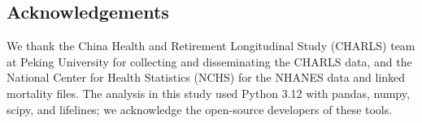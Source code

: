 \documentclass[11pt,a4paper]{article}
\begin{document}
\subsection*{Acknowledgements}
We thank the China Health and Retirement Longitudinal Study (CHARLS) team at Peking University for collecting and disseminating the CHARLS data, and the National Center for Health Statistics (NCHS) for the NHANES data and linked mortality files. The analysis in this study used Python 3.12 with pandas, numpy, scipy, and lifelines; we acknowledge the open-source developers of these tools.

\clearpage


\end{document}
